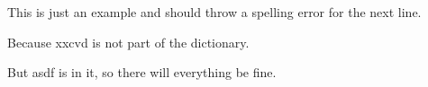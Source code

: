 \documentclass[a4paper,11pt,twoside]{scrartcl}
\begin{document}
This is just an example and should throw a spelling error for the next line.

Because xxcvd is not part of the dictionary.

But asdf is in it, so there will everything be fine.
\end{document}
